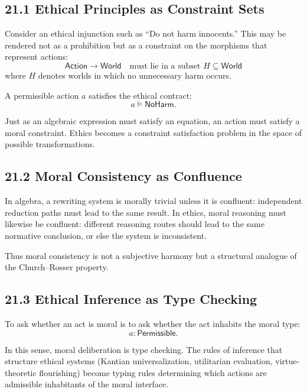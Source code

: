 \documentclass[12pt,letterpaper]{article}
\theoremstyle{remark}
\begin{document}
\subsection{21.1 Ethical Principles as Constraint Sets}

Consider an ethical injunction such as ``Do not harm innocents.'' This may be rendered not as a prohibition but as a constraint on the morphisms that represent actions:
\[
\mathsf{Action} \to \mathsf{World} \quad \text{must lie in a subset } H \subseteq \mathsf{World}
\]
where \(H\) denotes worlds in which no unnecessary harm occurs.

A permissible action \(a\) satisfies the ethical contract:
\[
a \vDash \mathsf{NoHarm}.
\]

Just as an algebraic expression must satisfy an equation, an action must satisfy a moral constraint. Ethics becomes a constraint satisfaction problem in the space of possible transformations.

\subsection{21.2 Moral Consistency as Confluence}

In algebra, a rewriting system is morally trivial unless it is confluent: independent reduction paths must lead to the same result. In ethics, moral reasoning must likewise be confluent: different reasoning routes should lead to the same normative conclusion, or else the system is inconsistent.

Thus moral consistency is not a subjective harmony but a structural analogue of the Church–Rosser property.

\subsection{21.3 Ethical Inference as Type Checking}

To ask whether an act is moral is to ask whether the act inhabits the moral type:
\[
a : \mathsf{Permissible}.
\]

In this sense, moral deliberation is type checking. The rules of inference that structure ethical systems (Kantian universalization, utilitarian evaluation, virtue-theoretic flourishing) become typing rules determining which actions are admissible inhabitants of the moral interface.
\end{document}
